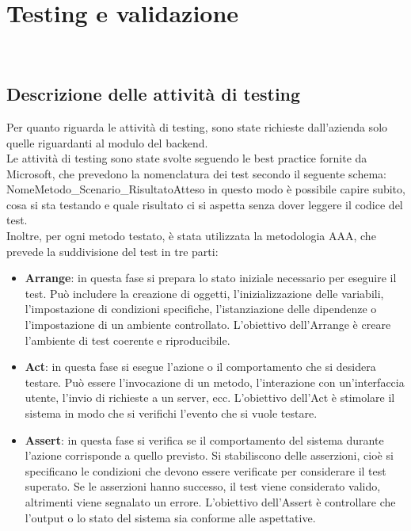 \chapter{Testing e validazione}
\label{cap:testing}
\\
\section{Descrizione delle attività di testing}
Per quanto riguarda le attività di testing, sono state richieste dall'azienda solo quelle riguardanti al modulo del backend.\\
Le attività di testing sono state svolte seguendo le best practice fornite da Microsoft, che prevedono la nomenclatura dei test secondo il seguente schema:\\
NomeMetodo\_Scenario\_RisultatoAtteso in questo modo è possibile capire subito, cosa si sta testando e quale risultato ci si aspetta senza dover leggere il codice del test.\\
Inoltre, per ogni metodo testato, è stata utilizzata la metodologia AAA, che prevede la suddivisione del test in tre parti:
\begin{itemize}
    \item \textbf{Arrange}: in questa fase si prepara lo stato iniziale necessario per eseguire il test. Può includere la creazione di oggetti, l'inizializzazione delle variabili, l'impostazione di condizioni specifiche, l'istanziazione delle dipendenze o l'impostazione di un ambiente controllato. L'obiettivo dell'Arrange è creare l'ambiente di test coerente e riproducibile.
    \item \textbf{Act}: in questa fase si esegue l'azione o il comportamento che si desidera testare. Può essere l'invocazione di un metodo, l'interazione con un'interfaccia utente, l'invio di richieste a un server, ecc. L'obiettivo dell'Act è stimolare il sistema in modo che si verifichi l'evento che si vuole testare.
    \item \textbf{Assert}: in questa fase si verifica se il comportamento del sistema durante l'azione corrisponde a quello previsto. Si stabiliscono delle asserzioni, cioè si specificano le condizioni che devono essere verificate per considerare il test superato. Se le asserzioni hanno successo, il test viene considerato valido, altrimenti viene segnalato un errore. L'obiettivo dell'Assert è controllare che l'output o lo stato del sistema sia conforme alle aspettative.
\end{itemize}

